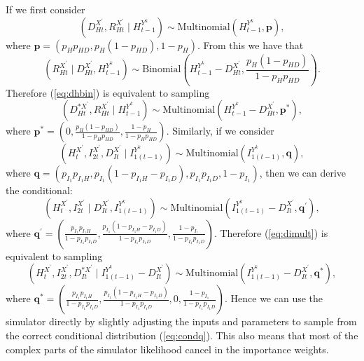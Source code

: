 \documentclass[a4paper]{article}
\newcommand{\bp}{\bm{p}}
\newcommand{\bq}{\bm{q}}
\begin{document}
If we first consider 
\begin{equation}
    \left(D^{X^\prime}_{Ht}, R^{X^\prime}_{Ht} \mid H^{Y^k}_{t - 1}\right) \sim \mbox{Multinomial}\left(H^{Y^k}_{t - 1}, \bp\right),
\end{equation}
where $\bp = \left(p_Hp_{HD}, p_H\left(1 - p_{HD}\right), 1 - p_H\right)$. From this we have that
\begin{equation}
    \left(R^{X^\prime}_{Ht} \mid D^{X^\prime}_{Ht}, H^{Y^k}_{t - 1}\right) \sim \mbox{Binomial}\left(H^{Y^k}_{t - 1} - D^{X^\prime}_{Ht}, \frac{p_H\left(1 - p_{HD}\right)}{1 - p_Hp_{HD}}\right).\label{eq:dhbin}
\end{equation}
Therefore (\ref{eq:dhbin}) is equivalent to sampling
\begin{equation}
    \left(D^{\ast X^\prime}_{Ht}, R^{X^\prime}_{Ht} \mid H^{Y^k}_{t - 1}\right) \sim \mbox{Multinomial}\left(H^{Y^k}_{t - 1} - D^{X^\prime}_{Ht}, \bp^\ast\right),
\end{equation}
where $\bp^\ast = \left(0, \frac{p_H\left(1 - p_{HD}\right)}{1 - p_Hp_{HD}}, \frac{1 - p_H}{1 - p_Hp_{HD}}\right)$. Similarly, if we consider
\begin{equation}
    \left(H^{X^\prime}_t, I^{X^\prime}_{2t}, D^{X^\prime}_{It} \mid I^{Y^k}_{1(t - 1)}\right) \sim \mbox{Multinomial}\left(I^{Y^k}_{1(t - 1)}, \bq\right),
\end{equation}
where $\bq = \left(p_{I_1}p_{I_1H}, p_{I_1}\left(1 - p_{I_1H} - p_{I_1D}\right), p_{I_1}p_{I_1D}, 1 - p_{I_1}\right)$, then we can derive the conditional:
\begin{equation}
    \left(H^{X^\prime}_t, I^{X^\prime}_{2t} \mid D^{X^\prime}_{It}, I^{Y^k}_{1(t - 1)}\right) \sim \mbox{Multinomial}\left(I^{Y^k}_{1(t - 1)} - D^{X^\prime}_{It}, \bq^\prime\right),\label{eq:dimult}
\end{equation}
where $\bq^\prime = \left(\frac{p_{I_1}p_{I_1H}}{1 - p_{I_1}p_{I_1D}}, \frac{p_{I_1}\left(1 - p_{I_1H} - p_{I_1D}\right)}{1 - p_{I_1}p_{I_1D}}, \frac{1 - p_{I_1}}{1 - p_{I_1}p_{I_1D}}\right)$. Therefore (\ref{eq:dimult}) is equivalent to sampling
\begin{equation}
    \left(H^{X^\prime}_t, I^{X^\prime}_{2t}, D^{\ast X^\prime}_{It} \mid I^{Y^k}_{1(t - 1)} - D^{X^\prime}_{It}\right) \sim \mbox{Multinomial}\left(I^{Y^k}_{1(t - 1)} - D^{X^\prime}_{It}, \bq^\ast\right),
\end{equation}
where $\bq^\ast = \left(\frac{p_{I_1}p_{I_1H}}{1 - p_{I_1}p_{I_1D}}, \frac{p_{I_1}\left(1 - p_{I_1H} - p_{I_1D}\right)}{1 - p_{I_1}p_{I_1D}}, 0, \frac{1 - p_{I_1}}{1 - p_{I_1}p_{I_1D}}\right)$. Hence we can use the simulator directly by slightly adjusting the inputs and parameters to sample from the correct conditional distribution (\ref{eq:condq}). This also means that most of the complex parts of the simulator likelihood cancel in the importance weights.
\end{document}
